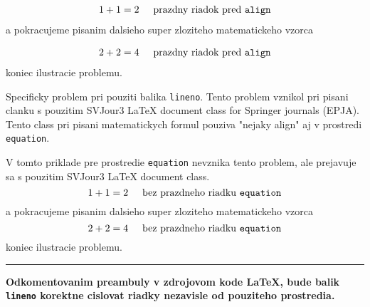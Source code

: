 \documentclass[twocolumn]{article}
\begin{document}
\begin{align}
  1+1=2 \hspace{0.5cm}\text{prazdny riadok pred }\texttt{align}
\end{align}
a pokracujeme pisanim dalsieho super zloziteho matematickeho vzorca

\begin{align}
  2+2=4 \hspace{0.5cm}\text{prazdny riadok pred }\texttt{align}
\end{align}
koniec ilustracie problemu.

\newpage
Specificky problem pri pouziti balika \texttt{lineno}. Tento problem vznikol pri
pisani clanku s pouzitim SVJour3 LaTeX document class for Springer journals
(EPJA). Tento class pri pisani matematickych formul pouziva "nejaky align" aj v
prostredi \texttt{equation}.

V tomto priklade pre prostredie \texttt{equation} nevznika tento problem,
ale prejavuje sa s pouzitim SVJour3 LaTeX document class.
\begin{equation}
  1+1=2 \hspace{0.5cm}\text{bez prazdneho riadku }\texttt{equation}
\end{equation}
a pokracujeme pisanim dalsieho super zloziteho matematickeho vzorca
\begin{equation}
  2+2=4 \hspace{0.5cm}\text{bez prazdneho riadku }\texttt{equation}
\end{equation}
koniec ilustracie problemu.

\vspace{0.5cm}
\hrule
\vspace{0.5cm}
\textbf{Odkomentovanim preambuly v zdrojovom kode \LaTeX, bude balik
  \texttt{lineno} korektne cislovat riadky nezavisle od pouziteho prostredia.}
\end{document}
